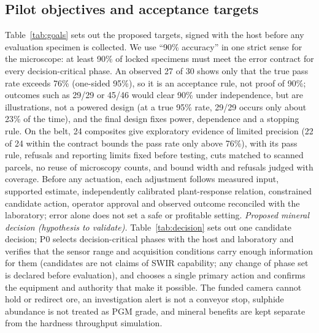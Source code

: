 \documentclass[10pt,a4paper,twocolumn]{article}
\begin{document}
\subsection{Pilot objectives and acceptance targets}\label{sec:goals}

Table~\ref{tab:goals} sets out the proposed targets, signed with the host before any evaluation specimen is collected. We use ``90\% accuracy'' in one strict sense for the microscope: at least 90\% of locked specimens must meet the error contract for every decision-critical phase. An observed 27 of 30 shows only that the true pass rate exceeds 76\% (one-sided 95\%), so it is an acceptance rule, not proof of 90\%; outcomes such as 29/29 or 45/46 would clear 90\% under independence, but are illustrations, not a powered design (at a true 95\% rate, 29/29 occurs only about 23\% of the time), and the final design fixes power, dependence and a stopping rule. On the belt, 24 composites give exploratory evidence of limited precision (22 of 24 within the contract bounds the pass rate only above 76\%), with its pass rule, refusals and reporting limits fixed before testing, cuts matched to scanned parcels, no reuse of microscopy counts, and bound width and refusals judged with coverage. Before any actuation, each adjustment follows measured input, supported estimate, independently calibrated plant-response relation, constrained candidate action, operator approval and observed outcome reconciled with the laboratory; error alone does not set a safe or profitable setting. \emph{Proposed mineral decision (hypothesis to validate).} Table~\ref{tab:decision} sets out one candidate decision; P0 selects decision-critical phases with the host and laboratory and verifies that the sensor range and acquisition conditions carry enough information for them (candidates are not claims of SWIR capability; any change of phase set is declared before evaluation), and chooses a single primary action and confirms the equipment and authority that make it possible. The funded camera cannot hold or redirect ore, an investigation alert is not a conveyor stop, sulphide abundance is not treated as PGM grade, and mineral benefits are kept separate from the hardness throughput simulation.
\end{document}
